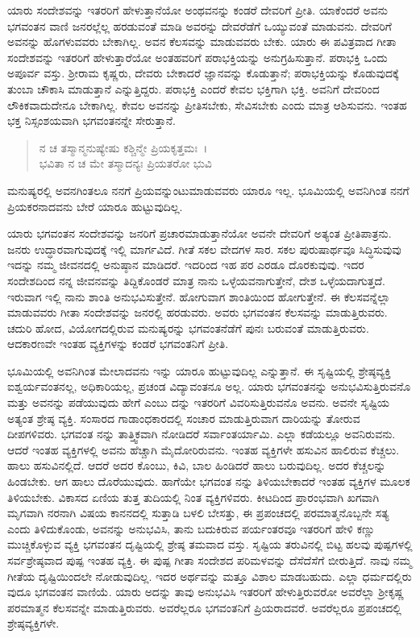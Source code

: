 ಯಾರು ಸಂದೇಶವನ್ನು ಇತರರಿಗೆ ಹೇಳುತ್ತಾನೆಯೋ ಅಂಥವನನ್ನು ಕಂಡರೆ ದೇವರಿಗೆ ಪ್ರೀತಿ. ಯಾಕೆಂದರೆ ಅವನು ಭಗವಂತನ ವಾಣಿ ಜನರಲ್ಲೆಲ್ಲ ಹರಡುವಂತೆ ಮಾಡಿ ಅವರನ್ನು ದೇವರೆಡೆಗೆ ಒಯ್ಯುವಂತೆ ಮಾಡುವನು. ದೇವರಿಗೆ ಅವನನ್ನು ಹೊಗಳುವವರು ಬೇಕಾಗಿಲ್ಲ. ಅವನ ಕೆಲಸವನ್ನು ಮಾಡುವವರು ಬೇಕು. ಯಾರು ಈ ಪವಿತ್ರವಾದ ಗೀತಾ ಸಂದೇಶವನ್ನು ಇತರರಿಗೆ ಹೇಳುತ್ತಾರೆಯೋ ಅಂತಹವರಿಗೆ ಪರಾಭಕ್ತಿಯನ್ನು ಅನುಗ್ರಹಿಸುತ್ತಾನೆ. ಪರಾಭಕ್ತಿ ಒಂದು ಅಪೂರ್ವ ವಸ್ತು. ಶ‍್ರೀರಾಮ ಕೃಷ್ಣರು, ದೇವರು ಬೇಕಾದರೆ ಜ್ಞಾನವನ್ನು ಕೊಡುತ್ತಾನೆ; ಪರಾಭಕ್ತಿಯನ್ನು ಕೊಡುವುದಕ್ಕೆ ತುಂಬಾ ಚೌಕಾಸಿ ಮಾಡುತ್ತಾನೆ ಎನ್ನುತ್ತಿದ್ದರು. ಪರಾಭಕ್ತಿ ಎಂದರೆ ಕೇವಲ ಭಕ್ತಿಗಾಗಿ ಭಕ್ತಿ. ಅವನಿಗೆ ದೇವರಿಂದ ಲೌಕಿಕವಾದುದೇನೂ ಬೇಕಾಗಿಲ್ಲ. ಕೇವಲ ಅವನನ್ನು ಪ್ರೀತಿಸಬೇಕು, ಸೇವಿಸಬೇಕು ಎಂದು ಮಾತ್ರ ಆಶಿಸುವನು. ಇಂತಹ ಭಕ್ತ ನಿಸ್ಸಂಶಯವಾಗಿ ಭಗವಂತನನ್ನೇ ಸೇರುತ್ತಾನೆ.

\begin{verse}
ನ ಚ ತಸ್ಮಾನ್ಮನುಷ್ಯೇಷು ಕಶ್ಚಿನ್ಮೇ ಪ್ರಿಯಕೃತ್ತಮಃ~।\\ಭವಿತಾ ನ ಚ ಮೇ ತಸ್ಮಾದನ್ಯಃ ಪ್ರಿಯತರೋ ಭುವಿ 
\end{verse}

{\small ಮನುಷ್ಯರಲ್ಲಿ ಅವನಗಿಂತಲೂ ನನಗೆ ಪ್ರಿಯವನ್ನುಂಟುಮಾಡುವವರು ಯಾರೂ ಇಲ್ಲ. ಭೂಮಿಯಲ್ಲಿ ಅವನಿಗಿಂತ ನನಗೆ ಪ್ರಿಯಕರನಾದವನು ಬೇರೆ ಯಾರೂ ಹುಟ್ಟುವುದಿಲ್ಲ.}

ಯಾರು ಭಗವಂತನ ಸಂದೇಶವನ್ನು ಜನರಿಗೆ ಪ್ರಚಾರಮಾಡುತ್ತಾನೆಯೋ ಅವನೇ ದೇವರಿಗೆ ಅತ್ಯಂತ ಪ್ರೀತಿಪಾತ್ರನು. ಜನರು ಉದ್ಧಾರವಾಗುವುದಕ್ಕೆ ಇಲ್ಲಿ ಮಾರ್ಗವಿದೆ. ಗೀತೆ ಸಕಲ ವೇದಗಳ ಸಾರ. ಸಕಲ ಪುರುಷಾರ್ಥವೂ ಸಿದ್ಧಿಸುವುವು ಇದನ್ನು ನಮ್ಮ ಜೀವನದಲ್ಲಿ ಅನುಷ್ಠಾನ ಮಾಡಿದರೆ. ಇದರಿಂದ ಇಹ ಪರ ಎರಡೂ ದೊರಕುವುವು. ಇದರ ಸಂದೇಶದಿಂದ ನನ್ನ ಜೀವನವನ್ನು ತಿದ್ದಿಕೊಂಡರೆ ಮಾತ್ರ ನಾನು ಒಳ್ಳೆಯವನಾಗುತ್ತೇನೆ, ದೇಶ ಒಳ್ಳೆಯದಾಗುತ್ತದೆ. ಇರುವಾಗ ಇಲ್ಲಿ ನಾನು ಶಾಂತಿ ಅನುಭವಿಸುತ್ತೇನೆ. ಹೋಗುವಾಗ ಶಾಂತಿಯಿಂದ ಹೋಗುತ್ತೇನೆ. ಈ ಕೆಲಸವನ್ನೆಲ್ಲಾ ಮಾಡುವವರು ಗೀತಾ ಸಂದೇಶವನ್ನು ಜನರಲ್ಲಿ ಹರಡುವರು. ಅವರು ಭಗವಂತನ ಕೆಲಸವನ್ನು ಮಾಡುತ್ತಿರುವರು. ಚದುರಿ ಹೋದ, ವಿಯೋಗದಲ್ಲಿರುವ ಮನುಷ್ಯರನ್ನು ಭಗವಂತನೆಡೆಗೆ ಪುನಃ ಬರುವಂತೆ ಮಾಡುತ್ತಿರುವರು. ಆದಕಾರಣವೇ ಇಂತಹ ವ್ಯಕ್ತಿಗಳನ್ನು ಕಂಡರೆ ಭಗವಂತನಿಗೆ ಪ್ರೀತಿ.

ಭೂಮಿಯಲ್ಲಿ ಅವನಿಗಿಂತ ಮೇಲಾದವನು ಇನ್ನು ಯಾರೂ ಹುಟ್ಟುವುದಿಲ್ಲ ಎನ್ನುತ್ತಾನೆ. ಈ ಸೃಷ್ಟಿಯಲ್ಲಿ ಶ್ರೇಷ್ಠವ್ಯಕ್ತಿ ಐಶ್ವರ್ಯವಂತನಲ್ಲ, ಅಧಿಕಾರಿಯಲ್ಲ, ಪ್ರಚಂಡ ವಿದ್ಯಾವಂತನೂ ಅಲ್ಲ. ಯಾರು ಭಗವಂತನನ್ನು ಅನುಭವಿಸುತ್ತಿರುವನೊ ಮತ್ತು ಅವನನ್ನು ಪಡೆಯುವುದು ಹೇಗೆ ಎಂಬು ದನ್ನು ಇತರರಿಗೆ ವಿವರಿಸುತ್ತಿರುವನೊ ಅವನು. ಅವನೇ ಸೃಷ್ಟಿಯ ಅತ್ಯಂತ ಶ್ರೇಷ್ಠ ವ್ಯಕ್ತಿ. ಸಂಸಾರದ ಗಾಡಾಂಧಕಾರದಲ್ಲಿ ಸಂಚಾರ ಮಾಡುತ್ತಿರುವಾಗ ದಾರಿಯನ್ನು ತೋರುವ ದೀಪಗಳಿವರು. ಭಗವಂತ ನನ್ನು ತಾತ್ತ್ವಿಕವಾಗಿ ನೋಡಿದರೆ ಸರ್ವಾಂತರ್ಯಾಮಿ. ಎಲ್ಲಾ ಕಡೆಯಲ್ಲೂ ಅವನಿರುವನು. ಆದರೆ ಇಂತಹ ವ್ಯಕ್ತಿಗಳಲ್ಲಿ ಅವನು ಹೆಚ್ಚಾಗಿ ಮೈದೋರಿರುವನು. ಇಂತಹ ವ್ಯಕ್ತಿಗಳೇ ಹಸುವಿನ ಹಾಲಿರುವ ಕೆಚ್ಚಲು. ಹಾಲು ಹಸುವಿನಲ್ಲಿದೆ. ಆದರೆ ಅದರ ಕೊಂಬು, ಕಿವಿ, ಬಾಲ ಹಿಂಡಿದರೆ ಹಾಲು ಬರುವುದಿಲ್ಲ. ಅದರ ಕೆಚ್ಚಲನ್ನು ಹಿಂಡಬೇಕು. ಆಗ ಹಾಲು ದೊರೆಯುವುದು. ಹಾಗೆಯೇ ಭಗವಂತ ನನ್ನು ತಿಳಿಯಬೇಕಾದರೆ ಇಂತಹ ವ್ಯಕ್ತಿಗಳ ಮೂಲಕ ತಿಳಿಯಬೇಕು. ವಿಕಾಸದ ಏಣಿಯ ತುತ್ತ ತುದಿಯಲ್ಲಿ ನಿಂತ ವ್ಯಕ್ತಿಗಳಿವರು. ಕೀಟದಿಂದ ಪ್ರಾರಂಭವಾಗಿ ಖಗವಾಗಿ ಮೃಗವಾಗಿ ನರನಾಗಿ ವಿಷಯ ಕಾನನದಲ್ಲಿ ಸುತ್ತಾಡಿ ಬಳಲಿ ಬೇಸತ್ತು, ಈ ಪ್ರಪಂಚದಲ್ಲಿ ಪರಮಾತ್ಮನೊಬ್ಬನೇ ಸತ್ಯ ಎಂದು ತಿಳಿದುಕೊಂಡು, ಅವನನ್ನು ಅನುಭವಿಸಿ, ತಾನು ಬದುಕಿರುವ ಪರ್ಯಂತರವೂ ಇತರರಿಗೆ ಹೇಳಿ ಕಣ್ಣು ಮುಚ್ಚಿಕೊಳ್ಳುವ ವ್ಯಕ್ತಿ ಭಗವಂತನ ದೃಷ್ಟಿಯಲ್ಲಿ ಶ್ರೇಷ್ಠ ತಮವಾದ ವಸ್ತು. ಸೃಷ್ಟಿಯ ತರುವಿನಲ್ಲಿ ಬಿಟ್ಟ ಹಲವು ಪುಷ್ಪಗಳಲ್ಲಿ ಸರ್ವಶ್ರೇಷ್ಠವಾದ ಪುಷ್ಪ ಇಂತಹ ವ್ಯಕ್ತಿ. ಈ ಪುಷ್ಪ ಗೀತಾ ಸಂದೇಶದ ಪರಿಮಳವನ್ನು ದೆಸೆದೆಸೆಗೆ ಬೀರುತ್ತಿದೆ. ನಾವು ನಮ್ಮ ಗೀತೆಯ ದೃಷ್ಟಿಯಿಂದಲೇ ನೋಡುವುದಿಲ್ಲ. ಇದರ ಅರ್ಥವನ್ನು ಮತ್ತೂ ವಿಶಾಲ ಮಾಡಬಹುದು. ಎಲ್ಲಾ ಧರ್ಮದಲ್ಲಿರು ವುದೂ ಭಗವಂತನ ವಾಣಿಯೆ. ಯಾರು ಅದನ್ನು ತಾವು ಅನುಭವಿಸಿ ಇತರರಿಗೆ ಹೇಳುತ್ತಿರುವರೋ ಅವರೆಲ್ಲಾ ಶ‍್ರೀಕೃಷ್ಣ ಪರಮಾತ್ಮನ ಕೆಲಸವನ್ನೇ ಮಾಡುತ್ತಿರುವರು. ಅವರೆಲ್ಲರೂ ಭಗವಂತನಿಗೆ ಪ್ರಿಯರಾದವರೆ. ಅವರೆಲ್ಲರೂ ಪ್ರಪಂಚದಲ್ಲಿ ಶ್ರೇಷ್ಠವ್ಯಕ್ತಿಗಳೇ.

